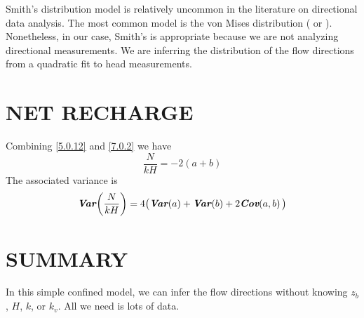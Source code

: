 \documentclass[12pt]{report}
\newcommand{\var}[1]{\ensuremath{\text{\textbf{\textit{Var}}}\negmedspace\left(#1\right)}}
\newcommand{\cov}[1]{\ensuremath{\text{\textbf{\textit{Cov}}}\negmedspace\left(#1\right)}}
\begin{document}
Smith's distribution model is relatively uncommon in the literature on directional data analysis. The most common model is the von Mises distribution (\citet{Mardia1972} or \citet{Watson1983}). Nonetheless, in our case, Smith's is appropriate because we are not analyzing directional measurements. We are inferring the distribution of the flow directions from a quadratic fit to head measurements.



\chapter{NET RECHARGE}
Combining \eqref{5.0.12} and \eqref{7.0.2} we have
%
\begin{equation}\label{9.0.1}
    \frac{N}{kH} = -2(a + b)
\end{equation}
%
The associated variance is
%
\begin{equation}\label{9.0.2}
    \var{\frac{N}{kH}} = 4 \big( \var{a} + \var{b} + 2 \cov{a, b} \big)
\end{equation}



\chapter{SUMMARY}
\vspace{0.2in}
\begin{tcolorbox}
{\Large In this simple confined model, we can infer the flow directions without knowing $z_b$, $H$, $k$, or $k_v$. All we need is lots of data.}
\end{tcolorbox}


\newpage




\newpage
\appendix
\end{document}
